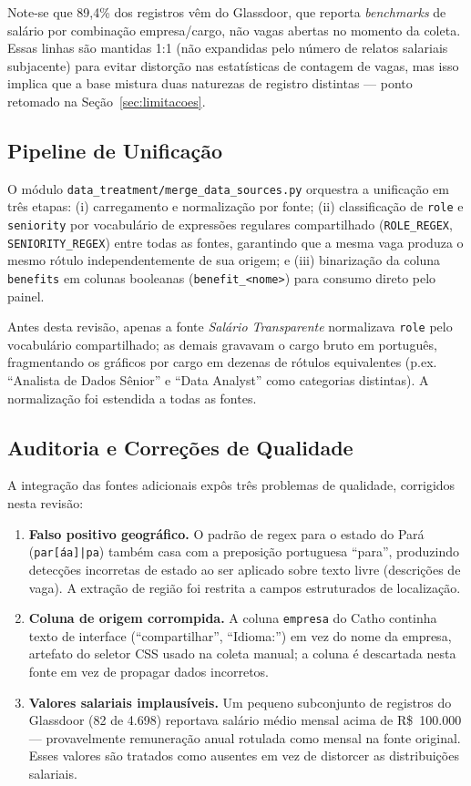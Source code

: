 \documentclass[10pt,twocolumn]{article}
\begin{document}
Note-se que 89,4\% dos registros vêm do Glassdoor, que reporta \emph{benchmarks}
de salário por combinação empresa/cargo, não vagas abertas no momento da
coleta. Essas linhas são mantidas 1:1 (não expandidas pelo número de relatos
salariais subjacente) para evitar distorção nas estatísticas de contagem de
vagas, mas isso implica que a base mistura duas naturezas de registro distintas
--- ponto retomado na Seção~\ref{sec:limitacoes}.

\subsection{Pipeline de Unificação}

O módulo \texttt{data\_treatment/merge\_data\_sources.py} orquestra a
unificação em três etapas: (i) carregamento e normalização por fonte; (ii)
classificação de \texttt{role} e \texttt{seniority} por vocabulário de
expressões regulares compartilhado (\texttt{ROLE\_REGEX}, \texttt{SENIORITY\_REGEX})
entre todas as fontes, garantindo que a mesma vaga produza o mesmo rótulo
independentemente de sua origem; e (iii) binarização da coluna
\texttt{benefits} em colunas booleanas (\texttt{benefit\_<nome>}) para consumo
direto pelo painel.

Antes desta revisão, apenas a fonte \emph{Salário Transparente} normalizava
\texttt{role} pelo vocabulário compartilhado; as demais gravavam o cargo bruto
em português, fragmentando os gráficos por cargo em dezenas de rótulos
equivalentes (p.ex. ``Analista de Dados Sênior'' e ``Data Analyst'' como
categorias distintas). A normalização foi estendida a todas as fontes.

\subsection{Auditoria e Correções de Qualidade}

A integração das fontes adicionais expôs três problemas de qualidade,
corrigidos nesta revisão:

\begin{enumerate}
\item \textbf{Falso positivo geográfico.} O padrão de regex para o estado do
  Pará (\texttt{par[áa]|pa}) também casa com a preposição portuguesa ``para'',
  produzindo detecções incorretas de estado ao ser aplicado sobre texto livre
  (descrições de vaga). A extração de região foi restrita a campos
  estruturados de localização.
\item \textbf{Coluna de origem corrompida.} A coluna \texttt{empresa} do
  Catho continha texto de interface (``compartilhar'', ``Idioma:'') em vez do
  nome da empresa, artefato do seletor CSS usado na coleta manual; a coluna é
  descartada nesta fonte em vez de propagar dados incorretos.
\item \textbf{Valores salariais implausíveis.} Um pequeno subconjunto de
  registros do Glassdoor (82 de 4.698) reportava salário médio mensal acima de
  R\$~100.000 --- provavelmente remuneração anual rotulada como mensal na
  fonte original. Esses valores são tratados como ausentes em vez de
  distorcer as distribuições salariais.
\end{enumerate}
\end{document}
